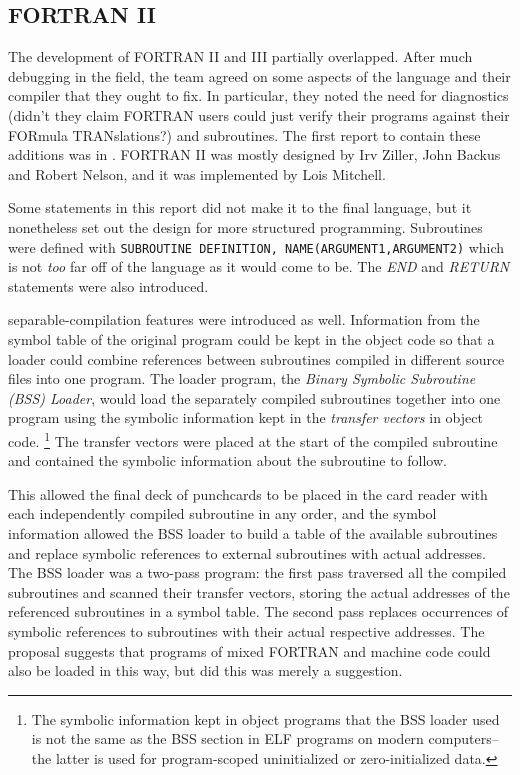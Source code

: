 \subsection{FORTRAN II}

The development of FORTRAN II and III partially overlapped.
After much debugging in the field, the team agreed on some aspects of the language
and their compiler that they ought to fix.
In particular, they noted the need for diagnostics (didn't they claim FORTRAN
users could just verify their programs against their FORmula TRANslations?)
and subroutines.
The first report to contain these additions was  in
\citeyear{fortran_ii_proposal_1957}.
FORTRAN II was mostly designed by Irv Ziller, John Backus and Robert Nelson,
and it was implemented by Lois Mitchell.

Some statements in this report did not make it to the final language, but it
nonetheless set out the design for more structured programming.
Subroutines were defined with \texttt{SUBROUTINE DEFINITION, NAME(ARGUMENT1,ARGUMENT2)}
which is not \textit{too} far off of the language as it would come to be.
The \textit{END} and \textit{RETURN} statements were also introduced.

\Gls{separable-compilation} features were introduced as well.
Information from the symbol table of the original program could be kept
in the object code so that a loader could combine references between subroutines
compiled in different source files into one program.
The loader program, the \textit{Binary Symbolic Subroutine (BSS) Loader},
would load the separately compiled subroutines together into one program using
the symbolic information kept in the \textit{transfer vectors} in object code.
\footnote{The symbolic information kept in object programs that the BSS loader
	used is not the same as the BSS section in ELF programs on modern computers--
	the latter is used for program-scoped uninitialized or zero-initialized data.}
The transfer vectors were placed at the start of the compiled subroutine and
contained the symbolic information about the subroutine to follow.

This allowed the final deck of punchcards to be placed in the card reader
with each independently compiled subroutine in any order, and the symbol information
allowed the BSS loader to build a table of the available subroutines and replace
symbolic references to external subroutines with actual addresses.
The BSS loader was a two-pass program: the first pass traversed all the compiled
subroutines and scanned their transfer vectors, storing the actual addresses of
the referenced subroutines in a symbol table.
The second pass replaces occurrences of symbolic references to subroutines
with their actual respective addresses.
The proposal suggests that programs of mixed FORTRAN and machine code could
also be loaded in this way, but did this was merely a suggestion.


